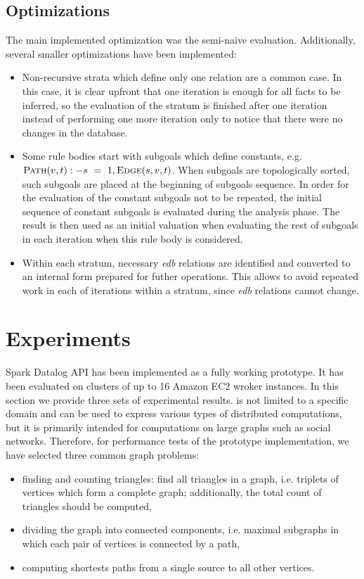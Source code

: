 \subsection{Optimizations}
The main implemented optimization was the semi-naive evaluation. Additionally, several smaller optimizations have been implemented:
\begin{itemize}
\item Non-recursive strata which define only one relation are a common case. In this case, it is clear upfront that one iteration is enough for all facts to be inferred, so the evaluation of the stratum is finished after one iteration instead of performing one more iteration only to notice that there were no changes in the database.
\item Some rule bodies start with subgoals which define constants, e.g. $\textsc{Path}(v,t) :- s~=~1, \textsc{Edge}(s, v, t)$. When subgoals are topologically sorted, such subgoals are placed at the beginning of subgoals sequence. In order for the evaluation of the constant subgoals not to be repeated, the initial sequence of constant subgoals is evaluated during the analysis phase. The result is then used as an initial valuation when evaluating the rest of subgoals in each iteration when this rule body is considered.
\item Within each stratum, necessary \emph{edb} relations are identified and converted to an internal form prepared for futher operations. This allows to avoid repeated work in each of iterations within a stratum, since \emph{edb} relations cannot change.
\end{itemize}

\section{Experiments}\label{s:impl_eval}
Spark Datalog API has been implemented as a fully working prototype. It has been evaluated on clusters of up to 16 Amazon EC2 wroker instances. In this section we provide three sets of experimental results. \datalogra is not limited to a specific domain and can be used to express various types of distributed computations, but it is primarily intended for computations on large graphs such as social networks. Therefore, for performance tests of the prototype implementation, we have selected three common graph problems: 
\begin{itemize}
\item finding and counting triangles: find all triangles in a graph, i.e. triplets of vertices which form a complete graph; additionally, the total count of triangles should be computed,
\item dividing the graph into connected components, i.e. maximal subgraphs in which each pair of vertices is connected by a path,
\item computing shortests paths from a single source to all other vertices.
\end{itemize}

